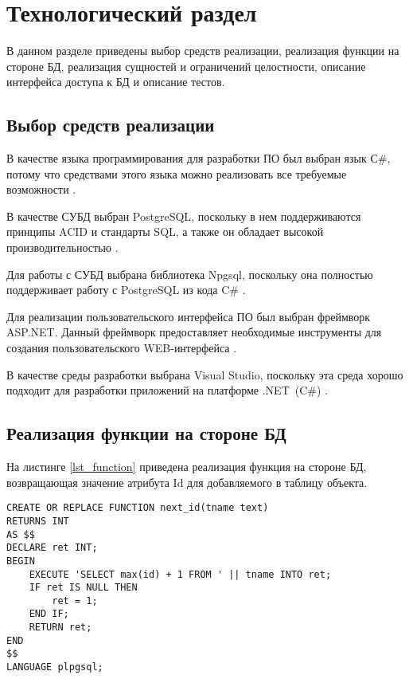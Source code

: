 \chapter{Технологический раздел}
В данном разделе приведены выбор средств реализации, реализация функции на стороне БД, реализация сущностей и ограничений целостности, описание интерфейса доступа к БД и описание тестов.

\section{Выбор средств реализации}
В качестве языка программирования для разработки ПО был выбран язык С\#, потому что средствами этого языка можно реализовать все требуемые возможности \cite{src_cs}.

В качестве СУБД выбран PostgreSQL, поскольку в нем поддерживаются принципы ACID и стандарты SQL, а также он обладает высокой производительностью \cite{src_pg}.

Для работы с СУБД выбрана библиотека Npgsql, поскольку она полностью поддерживает работу с PostgreSQL из кода C\# \cite{src_npgsql}.

Для реализации пользовательского интерфейса ПО был выбран фреймворк ASP.NET. Данный фреймворк предоставляет необходимые инструменты для создания пользовательского WEB-интерфейса \cite{src_asp}.

В качестве среды разработки выбрана Visual Studio, поскольку эта среда хорошо подходит для разработки приложений на платформе .NET~(C\#) \cite{src_vscode}.

\section{Реализация функции на стороне БД}
На листинге \ref{lst_function} приведена реализация функция на стороне БД, возвращающая значение атрибута Id для добавляемого в таблицу объекта.
\newpage
\begin{lstlisting}[label=lst_function,caption=\raggedright{Реализация функции на стороне БД}]
CREATE OR REPLACE FUNCTION next_id(tname text)
RETURNS INT
AS $$
DECLARE ret INT;
BEGIN
	EXECUTE 'SELECT max(id) + 1 FROM ' || tname INTO ret;
	IF ret IS NULL THEN
		ret = 1;
	END IF;
	RETURN ret;
END
$$
LANGUAGE plpgsql;
\end{lstlisting}

